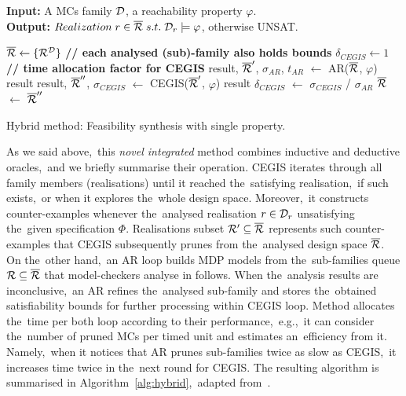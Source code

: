 \begin{algorithm}[H]
\hspace*{\algorithmicindent} \textbf{Input:} A MCs family $\mathcal{D}$, a reachability property $\varphi$. \\
\hspace*{\algorithmicindent} \textbf{Output:} $Realization\; r \in \overline{\mathcal{R}} \; s.t. \; \mathcal{D}_r \models \varphi$, otherwise UNSAT. \\
\vspace*{-1.5em}
\begin{algorithmic}[1]
    \STATE $\overline{\mathcal{R}} \leftarrow \{ \mathcal{R}^{\mathcal{D}} \}$ \hfill \textbf{// each analysed (sub)-family also holds bounds}
    \STATE $\delta_{CEGIS} \leftarrow 1$ \hfill \textbf{// time allocation factor for CEGIS}
    \WHILE{$\rlzf \neq \emptyset$}
        \STATE result, $\overline{\mathcal{R}}'$, $\sigma_{AR}$, $t_{AR}$ $\leftarrow$ AR($\overline{\mathcal{R}}$, $\varphi$)
            \RETURN result
        \ELSE
            \STATE result, $\overline{\mathcal{R}}''$, $\sigma_{CEGIS}$ $\leftarrow$ CEGIS($\overline{\mathcal{R}}'$, $\varphi$)
                \RETURN result
            \ELSE
                \STATE $\delta_{CEGIS}$ $\leftarrow$ $\sigma_{CEGIS}$ / $\sigma_{AR}$
                \STATE $\overline{\mathcal{R}}$ $\leftarrow$ $\overline{\mathcal{R}}''$
            \ENDIF
        \ENDIF
    \ENDWHILE
\end{algorithmic}
\caption{Hybrid method: Feasibility synthesis with single property.}
\label{alg:hybrid}
\end{algorithm}

As we said above,~this \textit{novel integrated} method combines inductive and deductive oracles,~and we briefly summarise their operation.
CEGIS iterates through all family members (realisations) until it reached the~satisfying realisation,~if such exists,~or when it explores the~whole design space.
Moreover,~it constructs counter-examples whenever the~analysed realisation $r \in \mathcal{D}_r$ unsatisfying the~given specification $\varPhi$.
Realisations subset $\mathcal{R}' \subseteq \overline{\mathcal{R}}$ represents such counter-examples that CEGIS subsequently prunes from the~analysed design space $\overline{\mathcal{R}}$.
On the~other hand,~an AR loop builds MDP models from the~sub-families queue $\mathcal{R} \subseteq \overline{\mathcal{R}}$ that model-checkers analyse in follows.
When the~analysis results are inconclusive,~an AR refines the~analysed sub-family and  stores the~obtained satisfiability bounds for further processing within CEGIS loop.
Method allocates the~time per both loop according to their performance,~e.g.,~it can consider the~number of pruned MCs per timed unit and estimates an~efficiency from it.
Namely,~when it notices that AR prunes sub-families twice as slow as CEGIS,~it increases time twice in the~next round for CEGIS.
The resulting algorithm is summarised in Algorithm~\ref{alg:hybrid},~adapted from~\cite{tacas21}.